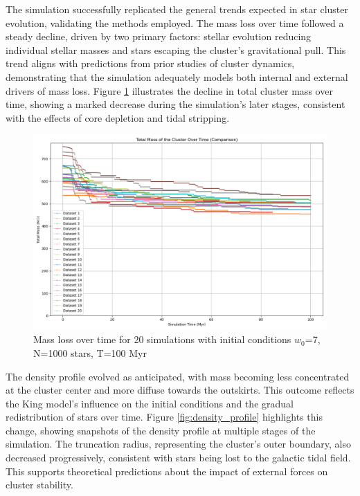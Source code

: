\documentclass[10pt,twocolumn]{article}
\begin{document}
The simulation successfully replicated the general trends expected in star cluster evolution, validating the methods employed. The mass loss over time followed a steady decline, driven by two primary factors: stellar evolution reducing individual stellar masses and stars escaping the cluster's gravitational pull. This trend aligns with predictions from prior studies of cluster dynamics, demonstrating that the simulation adequately models both internal and external drivers of mass loss. Figure \ref{fig:mass_loss} illustrates the decline in total cluster mass over time, showing a marked decrease during the simulation's later stages, consistent with the effects of core depletion and tidal stripping.

    \begin{figure}
        \centering
            \includegraphics[width=\linewidth]{mass_comparison_over_time.png}
            \caption{Mass loss over time for 20 simulations with initial conditions $w_0$=7, N=1000 stars, T=100 Myr}
            \label{fig:mass_loss}
    \end{figure}

The density profile evolved as anticipated, with mass becoming less concentrated at the cluster center and more diffuse towards the outskirts. This outcome reflects the King model's influence on the initial conditions and the gradual redistribution of stars over time. Figure \ref{fig:density_profile} highlights this change, showing snapshots of the density profile at multiple stages of the simulation. The truncation radius, representing the cluster's outer boundary, also decreased progressively, consistent with stars being lost to the galactic tidal field. This supports theoretical predictions about the impact of external forces on cluster stability.
\end{document}
